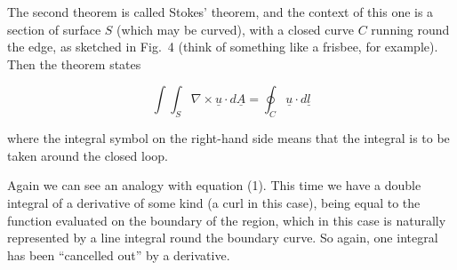   The second theorem is called Stokes' theorem, and the context of this one is 
  a section of surface $S$ (which may be curved), with a closed curve $C$ 
  running round the edge, as sketched in Fig.\ 4 (think of something like a 
  frisbee, for example). Then the theorem states 

  $$\int{\int_S{\nabla \times \underline{u} \cdot d\underline{A}}} = 
  \oint_C{\underline{u} \cdot d\underline{l}} \tag{12}$$ 

  where the integral symbol on the right-hand side means that the integral is 
  to be taken around the closed loop. 

  Again we can see an analogy with equation (1). This time we have a double 
  integral of a derivative of some kind (a curl in this case), being equal to 
  the function evaluated on the boundary of the region, which in this case is 
  naturally represented by a line integral round the boundary curve. So again, 
  one integral has been ``cancelled out'' by a derivative. 